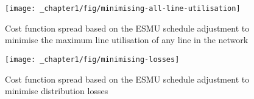 \begin{figure}\centering
	\texttt{[image: \_chapter1/fig/minimising-all-line-utilisation]}
	\caption{Cost function spread based on the ESMU schedule adjustment to minimise the maximum line utilisation of any line in the network}
\end{figure}

\begin{figure}\centering
	\texttt{[image: \_chapter1/fig/minimising-losses]}
	\caption{Cost function spread based on the ESMU schedule adjustment to minimise distribution losses}
\end{figure}
